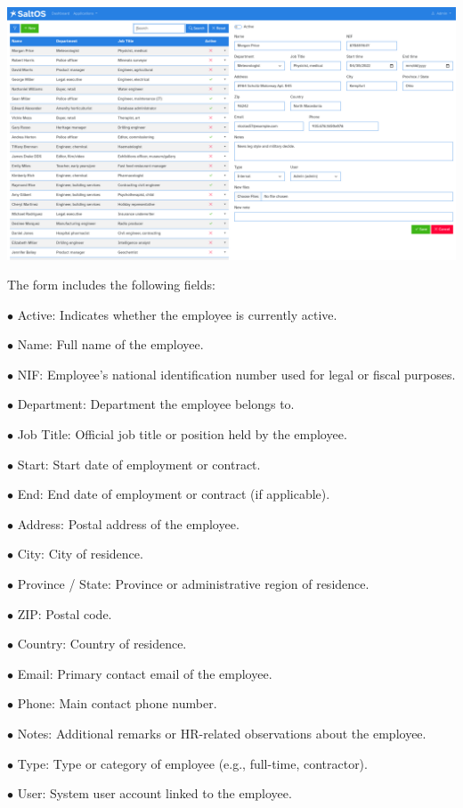 \documentclass[a4paper]{article}
\begin{document}
\begin{center}\includegraphics[width=1\textwidth]{../ujest/snaps/test-screenshots-js-screenshots-hr-employees-edit-100-en-us-1-snap.png}\end{center}

The form includes the following fields:

\begin{compactitem}
\item[\color{myblue}$\bullet$] Active: Indicates whether the employee is currently active.
\item[\color{myblue}$\bullet$] Name: Full name of the employee.
\item[\color{myblue}$\bullet$] NIF: Employee's national identification number used for legal or fiscal purposes.
\item[\color{myblue}$\bullet$] Department: Department the employee belongs to.
\item[\color{myblue}$\bullet$] Job Title: Official job title or position held by the employee.
\item[\color{myblue}$\bullet$] Start: Start date of employment or contract.
\item[\color{myblue}$\bullet$] End: End date of employment or contract (if applicable).
\item[\color{myblue}$\bullet$] Address: Postal address of the employee.
\item[\color{myblue}$\bullet$] City: City of residence.
\item[\color{myblue}$\bullet$] Province / State: Province or administrative region of residence.
\item[\color{myblue}$\bullet$] ZIP: Postal code.
\item[\color{myblue}$\bullet$] Country: Country of residence.
\item[\color{myblue}$\bullet$] Email: Primary contact email of the employee.
\item[\color{myblue}$\bullet$] Phone: Main contact phone number.
\item[\color{myblue}$\bullet$] Notes: Additional remarks or HR-related observations about the employee.
\item[\color{myblue}$\bullet$] Type: Type or category of employee (e.g., full-time, contractor).
\item[\color{myblue}$\bullet$] User: System user account linked to the employee.
\end{compactitem}
\end{document}
